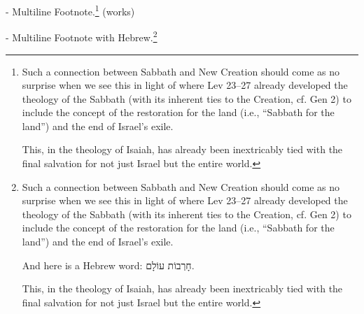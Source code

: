 \documentclass{article}
\begin{document}
- Multiline Footnote.\footnote{
	Such a connection between Sabbath and New Creation should come as no surprise when we see this in light of where Lev 23--27 already developed the theology of the Sabbath (with its inherent ties to the Creation, cf. Gen 2) to include the concept of the restoration for the land (i.e., ``Sabbath for the land'') and the end of Israel's exile. 
	
	This, in the theology of Isaiah, has already been inextricably tied with the final salvation for not just Israel but the entire world.} (works)
	
- Multiline Footnote with Hebrew.\footnote{
	Such a connection between Sabbath and New Creation should come as no surprise when we see this in light of where Lev 23--27 already developed the theology of the Sabbath (with its inherent ties to the Creation, cf. Gen 2) to include the concept of the restoration for the land (i.e., ``Sabbath for the land'') and the end of Israel's exile. 
	
	And here is a Hebrew word: \foreignlanguage{hebrew}{חָרְבוֹת עוֹלָם}.
	
	This, in the theology of Isaiah, has already been inextricably tied with the final salvation for not just Israel but the entire world.} 
\end{document}
